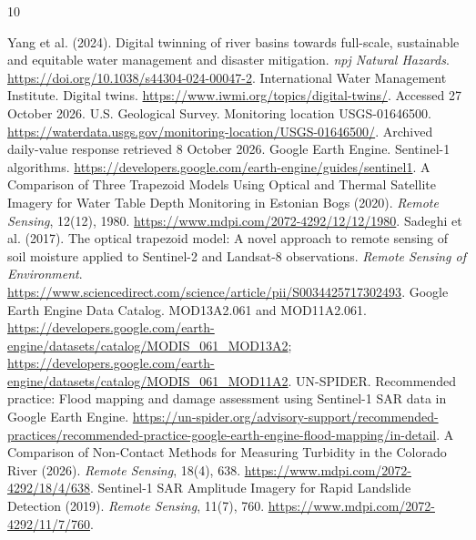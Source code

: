 \documentclass[11pt]{article}
\begin{document}
\begin{thebibliography}{10}
\raggedright
{} Yang et al. (2024). Digital twinning of river basins towards full-scale, sustainable and equitable water management and disaster mitigation. \emph{npj Natural Hazards}. \url{https://doi.org/10.1038/s44304-024-00047-2}.
 International Water Management Institute. Digital twins. \url{https://www.iwmi.org/topics/digital-twins/}. Accessed 27 October 2026.
 U.S. Geological Survey. Monitoring location USGS-01646500. \url{https://waterdata.usgs.gov/monitoring-location/USGS-01646500/}. Archived daily-value response retrieved 8 October 2026.
 Google Earth Engine. Sentinel-1 algorithms. \url{https://developers.google.com/earth-engine/guides/sentinel1}.
 A Comparison of Three Trapezoid Models Using Optical and Thermal Satellite Imagery for Water Table Depth Monitoring in Estonian Bogs (2020). \emph{Remote Sensing}, 12(12), 1980. \url{https://www.mdpi.com/2072-4292/12/12/1980}.
 Sadeghi et al. (2017). The optical trapezoid model: A novel approach to remote sensing of soil moisture applied to Sentinel-2 and Landsat-8 observations. \emph{Remote Sensing of Environment}. \url{https://www.sciencedirect.com/science/article/pii/S0034425717302493}.
 Google Earth Engine Data Catalog. MOD13A2.061 and MOD11A2.061. \url{https://developers.google.com/earth-engine/datasets/catalog/MODIS_061_MOD13A2}; \url{https://developers.google.com/earth-engine/datasets/catalog/MODIS_061_MOD11A2}.
 UN-SPIDER. Recommended practice: Flood mapping and damage assessment using Sentinel-1 SAR data in Google Earth Engine. \url{https://un-spider.org/advisory-support/recommended-practices/recommended-practice-google-earth-engine-flood-mapping/in-detail}.
 A Comparison of Non-Contact Methods for Measuring Turbidity in the Colorado River (2026). \emph{Remote Sensing}, 18(4), 638. \url{https://www.mdpi.com/2072-4292/18/4/638}.
 Sentinel-1 SAR Amplitude Imagery for Rapid Landslide Detection (2019). \emph{Remote Sensing}, 11(7), 760. \url{https://www.mdpi.com/2072-4292/11/7/760}.
\end{thebibliography}
\end{document}
